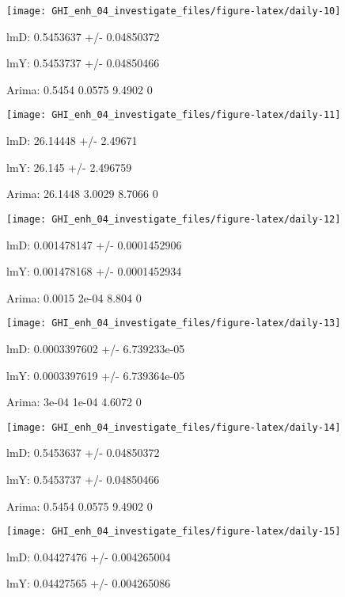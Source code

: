 \documentclass[
  10pt,
  a4paper,oneside]{article}
\begin{document}
\begin{center}\texttt{[image: GHI\_enh\_04\_investigate\_files/figure-latex/daily-10]} \end{center}

lmD: 0.5453637 +/- 0.04850372

lmY: 0.5453737 +/- 0.04850466

Arima: 0.5454 0.0575 9.4902 0

\begin{center}\texttt{[image: GHI\_enh\_04\_investigate\_files/figure-latex/daily-11]} \end{center}

lmD: 26.14448 +/- 2.49671

lmY: 26.145 +/- 2.496759

Arima: 26.1448 3.0029 8.7066 0

\begin{center}\texttt{[image: GHI\_enh\_04\_investigate\_files/figure-latex/daily-12]} \end{center}

lmD: 0.001478147 +/- 0.0001452906

lmY: 0.001478168 +/- 0.0001452934

Arima: 0.0015 2e-04 8.804 0

\begin{center}\texttt{[image: GHI\_enh\_04\_investigate\_files/figure-latex/daily-13]} \end{center}

lmD: 0.0003397602 +/- 6.739233e-05

lmY: 0.0003397619 +/- 6.739364e-05

Arima: 3e-04 1e-04 4.6072 0

\begin{center}\texttt{[image: GHI\_enh\_04\_investigate\_files/figure-latex/daily-14]} \end{center}

lmD: 0.5453637 +/- 0.04850372

lmY: 0.5453737 +/- 0.04850466

Arima: 0.5454 0.0575 9.4902 0

\begin{center}\texttt{[image: GHI\_enh\_04\_investigate\_files/figure-latex/daily-15]} \end{center}

lmD: 0.04427476 +/- 0.004265004

lmY: 0.04427565 +/- 0.004265086
\end{document}
